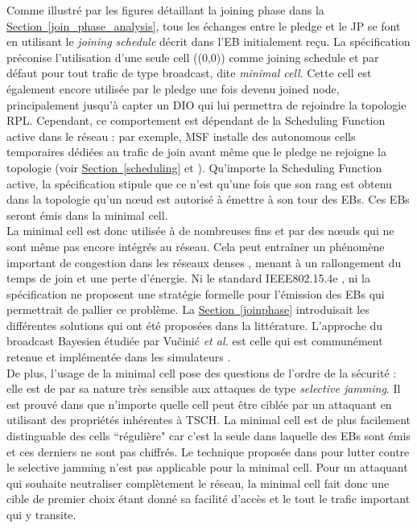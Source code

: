 \documentclass[]{report}
\newcommand{\wordlink}[2]{\hyperref[#2]{#1~\ref{#2}}}
\begin{document}
Comme illustré par les figures détaillant la joining phase dans la \wordlink{Section}{join_phase_analysis}, tous les échanges entre le pledge et le JP se font en utilisant le \textit{joining schedule} décrit dans l'EB initialement reçu. La spécification \cite{rfc8180} préconise l'utilisation d'une seule cell ((0,0)) comme joining schedule et par défaut pour tout trafic de type broadcast, dite \textit{minimal cell}. Cette cell est également encore utilisée par le pledge une fois devenu joined node, principalement jusqu'à capter un DIO qui lui permettra de rejoindre la topologie RPL. Cependant, ce comportement est dépendant de la Scheduling Function active dans le réseau : par exemple, MSF installe des autonomous cells temporaires dédiées au trafic de join avant même que le pledge ne rejoigne la topologie (voir \wordlink{Section}{scheduling} et \cite{ietf-6tisch-msf-10}). Qu'importe la Scheduling Function active, la spécification \cite{rfc8180} stipule que ce n'est qu'une fois que son rang est obtenu dans la topologie qu'un nœud est autorisé à émettre à son tour des EBs. Ces EBs seront émis dans la minimal cell.\\

La minimal cell est donc utilisée à de nombreuses fins et par des nœuds qui ne sont même pas encore intégrés au réseau. Cela peut entraîner un phénomène important de congestion dans les réseaux denses \cite{broadcast-strategies}, menant à un rallongement du temps de join et une perte d'énergie. Ni le standard IEEE802.15.4e \cite{IEEE802.15.4}, ni la spécification \cite{rfc8180} ne proposent une stratégie formelle pour l'émission des EBs qui permettrait de pallier ce problème. La \wordlink{Section}{joinphase} introduisait les différentes solutions qui ont été proposées dans la littérature. L'approche du broadcast Bayesien étudiée par Vučinić \textit{et al.} \cite{broadcast-strategies} est celle qui est communément retenue et implémentée dans les simulateurs \cite{simulating-6TiSCH}.\\

De plus, l'usage de la minimal cell pose des questions de l'ordre de la sécurité : elle est de par sa nature très sensible aux attaques de type \textit{selective jamming}. Il est prouvé dans \cite{tiloca-6tisch-robust-scheduling-02} que n'importe quelle cell peut être ciblée par un attaquant en utilisant des propriétés inhérentes à TSCH. La minimal cell est de plus facilement distinguable des cells ``régulière" car c'est la seule dans laquelle des EBs sont émis et ces derniers ne sont pas chiffrés. Le technique proposée dans \cite{tiloca-6tisch-robust-scheduling-02} pour lutter contre le selective jamming n'est pas applicable pour la minimal cell. Pour un attaquant qui souhaite neutraliser complètement le réseau, la minimal cell fait donc une cible de premier choix étant donné sa facilité d'accès et le tout le trafic important qui y transite.
\end{document}
